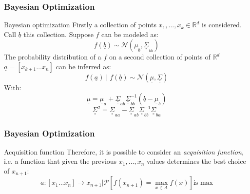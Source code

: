 \begin{frame}
    \frametitle{Bayesian Optimization}
    \vskip -0.5cm
    \begin{block}{Bayesian optimization}
        Firstly a collection of points $x_1, \ldots, x_k \in \mathbb{R}^d$ is considered. Call $\underline{b}$ this collection. Suppose $f$ can be modeled as:
        \begin{equation*}
            f\left(\underline{b}\right) \sim \mathcal{N}\left(\underline{\mu}_b, \underline{\underline{\Sigma}}_{bb}\right)
        \end{equation*}
        The probability distribution of a $f$ on a second collection of points of $\mathbb{R}^d$ $\underline{a} = \left[x_{k + 1} \ldots x_{n}\right]$ can be inferred as:
        \begin{equation*}
            f\left(\underline{a}\right) \mid f\left(\underline{b}\right) \sim \mathcal{N}\left(\underline{\mu}, \underline{\underline{\Sigma}}\right)
        \end{equation*}
        With:
        \begin{equation*}
            \underline{\mu} = \underline{\mu}_{a} + \underline{\underline{\Sigma}}_{ab}\underline{\underline{\Sigma}}_{bb}^{-1}\left(\underline{b} - \underline{\mu}_b\right)
        \end{equation*}
        \begin{equation*}
            \underline{\underline{\Sigma}}^2 = \underline{\underline{\Sigma}}_{aa} - \underline{\underline{\Sigma}}_{ab}\underline{\underline{\Sigma}}_{bb}^{-1}\underline{\underline{\Sigma}}_{ba}
        \end{equation*}
    \end{block}
\end{frame}

\begin{frame}
    \frametitle{Bayesian Optimization}
    \begin{exampleblock}{Acquisition function}
        Therefore, it is possible to consider an \emph{acquisition function}, i.e. a function that given the previous $x_1, \ldots, x_n$ values determines the best choice of $x_{n+1}$:
        \begin{equation*}
            a \colon \left[x_1 \ldots x_n\right] \rightarrow x_{n+1} \vert \mathcal{P}\left[f(x_{n+1}) = \max\limits_{x \in A} f\left(x\right)\right] \text{is max}
        \end{equation*}
    \end{exampleblock}
\end{frame}